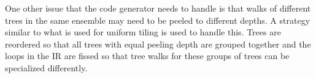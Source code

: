 One other issue that the code generator needs to handle is that walks of different trees in the same ensemble may 
need to be peeled to different depths. A strategy similar to what is used for uniform tiling is used to handle this.
Trees are reordered so that all trees 
with equal peeling depth are grouped together and the loops in the IR are fissed so that tree walks 
for these groups of trees can be specialized differently.
